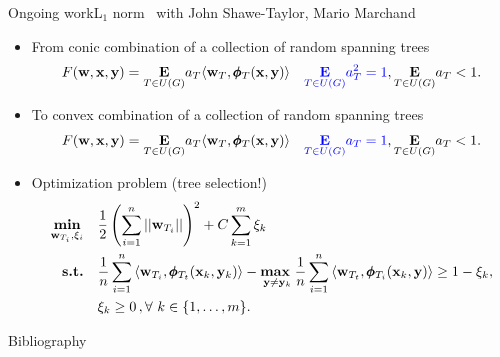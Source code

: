 \documentclass[first=dgreen,second=purple,logo=red]{aaltoslides}
\begin{document}
%
%
\begin{frame}{Ongoing work}{L$_1$ norm \rta\ with John Shawe-Taylor, Mario Marchand}
	\begin{itemize}\footnotesize
		\item From conic combination of a collection of random spanning trees
		\begin{align*}
			F(\mathbf {w},\mathbf {x},\mathbf {y}) = \underset{T\in U(G)}{\textbf{E}}a_T\langle \mathbf {w}_T, \pmb \phi_T(\mathbf {x},\mathbf {y}) \rangle\quad {\color{blue}\underset{T\in U(G)}{\textbf{E}}a_T^2=1},  \underset{T\in U(G)}{\textbf{E}}a_T<1.
		\end{align*}
		\item To convex combination of a collection of random spanning trees
		\begin{align*}
			F(\mathbf {w},\mathbf {x},\mathbf {y}) = \underset{T\in U(G)}{\textbf{E}}a_T\langle \mathbf {w}_T, \pmb \phi_T(\mathbf {x},\mathbf {y}) \rangle\quad {\color{blue}\underset{T\in U(G)}{\textbf{E}}a_T=1},  \underset{T\in U(G)}{\textbf{E}}a_T<1.
		\end{align*}
		\item Optimization problem (tree selection!)
		\begin{align*}
			\underset{\mathbf {w}_{T_i},\xi_i}{\textbf{min}} & \quad \frac{1}{2}\left(\sum_{i=1}^{n}\left|\left| \mathbf {w}_{T_i} \right|\right|\right)^2 + C\sum_{k=1}^{m}\xi_k\\
			\textbf{s.t.} & \quad \frac{1}{{n}}\sum_{i=1}^{n}{ \langle \mathbf {w}_{T_i}, \pmb \phi_{T_t}(\mathbf {x}_k,\mathbf {y}_k) \rangle} - \underset{\mathbf {y} \neq \mathbf {y}_k}{\textbf{max}\ } \frac{1}{{n}}\sum_{i=1}^{n}{\langle \mathbf {w}_{T_t}, \pmb \phi_{T_i}(\mathbf {x}_k,\mathbf {y}) \rangle } \geq 1 -  \xi_k, \\
			& \quad \xi_k\ge0\, , \forall\ k \in \{ 1,\dots,m \}.
		\end{align*}
	\end{itemize}
\end{frame}






\begin{frame}[allowframebreaks]{Bibliography}
%

 
\end{frame}
\end{document}

